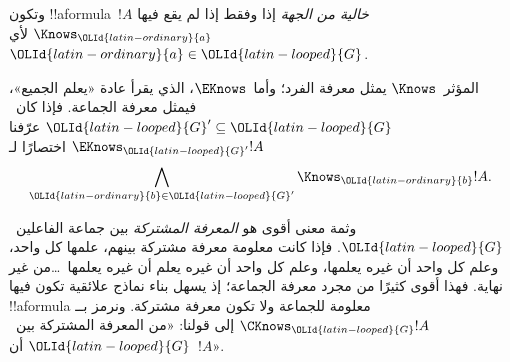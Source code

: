 \documentclass[../../../include/open-logic-section]{subfiles}
\begin{document}
وتكون !!a{formula}~$!A$ \emph{خالية من الجهة} إذا وفقط إذا لم يقع فيها
$\Knows_{\OLId{latin-ordinary}{a}}$ لأي~${\OLId{latin-ordinary}{a}} \in {\OLId{latin-looped}{G}}$.

\begin{defn}
  المؤثر~$\Knows$ يمثل معرفة الفرد؛ وأما~$\EKnows$، الذي يقرأ عادة
  «يعلم الجميع»، فيمثل معرفة الجماعة. فإذا كان~${\OLId{latin-looped}{G}}' \subseteq {\OLId{latin-looped}{G}}$ عرّفنا
  $\EKnows_{{\OLId{latin-looped}{G}}'} !A$ اختصارًا لـ
  \[\bigwedge_{{\OLId{latin-ordinary}{b}} \in {\OLId{latin-looped}{G}}'} \Knows_{\OLId{latin-ordinary}{b}} !A.\]
\end{defn}

وثمة معنى أقوى هو \emph{المعرفة المشتركة} بين جماعة الفاعلين~${\OLId{latin-looped}{G}}$. فإذا
كانت معلومة معرفة مشتركة بينهم، علمها كل واحد، وعلم كل واحد أن غيره
يعلمها، وعلم كل واحد أن غيره يعلم أن غيره يعلمها~\dots من غير نهاية.
فهذا أقوى كثيرًا من مجرد معرفة الجماعة؛ إذ يسهل بناء نماذج علائقية تكون
فيها !!a{formula} معلومة للجماعة ولا تكون معرفة مشتركة. ونرمز بــ
$\CKnows_{\OLId{latin-looped}{G}} !A$ إلى قولنا: «من المعرفة المشتركة بين~${\OLId{latin-looped}{G}}$ أن~$!A$».
\end{document}
